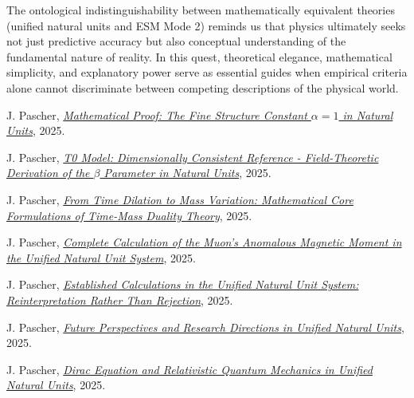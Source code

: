 \documentclass[12pt,a4paper]{article}
\begin{document}
	The ontological indistinguishability between mathematically equivalent theories (unified natural units and ESM Mode 2) reminds us that physics ultimately seeks not just predictive accuracy but also conceptual understanding of the fundamental nature of reality. In this quest, theoretical elegance, mathematical simplicity, and explanatory power serve as essential guides when empirical criteria alone cannot discriminate between competing descriptions of the physical world.
	
	\begin{thebibliography}{99}
		J. Pascher, \href{https://github.com/jpascher/T0-Time-Mass-Duality/blob/main/2/pdf/ResolvingTheConstantsAlfaEn.pdf}{\textit{Mathematical Proof: The Fine Structure Constant $\alpha = 1$ in Natural Units}}, 2025.
		
		J. Pascher, \href{https://github.com/jpascher/T0-Time-Mass-Duality/blob/main/2/pdf/DerivationVonBetaEn.pdf}{\textit{T0 Model: Dimensionally Consistent Reference - Field-Theoretic Derivation of the $\beta$ Parameter in Natural Units}}, 2025.
		
		J. Pascher, \href{https://github.com/jpascher/T0-Time-Mass-Duality/blob/main/2/pdf/MathZeitMasseLagrangeEn.pdf}{\textit{From Time Dilation to Mass Variation: Mathematical Core Formulations of Time-Mass Duality Theory}}, 2025.
		
		J. Pascher, \href{https://github.com/jpascher/T0-Time-Mass-Duality/blob/main/2/pdf/CompleteMuon_g-2_AnalysisEn.pdf}{\textit{Complete Calculation of the Muon's Anomalous Magnetic Moment in the Unified Natural Unit System}}, 2025.
		
		J. Pascher, \href{https://github.com/jpascher/T0-Time-Mass-Duality/blob/main/2/pdf/PragmaticApproachT0-ModelEn.pdf}{\textit{Established Calculations in the Unified Natural Unit System: Reinterpretation Rather Than Rejection}}, 2025.
		
		J. Pascher, \href{https://github.com/jpascher/T0-Time-Mass-Duality/blob/main/2/pdf/ausblicke_En.pdf}{\textit{Future Perspectives and Research Directions in Unified Natural Units}}, 2025.
		
		J. Pascher, \href{https://github.com/jpascher/T0-Time-Mass-Duality/blob/main/2/pdf/diracEn.pdf}{\textit{Dirac Equation and Relativistic Quantum Mechanics in Unified Natural Units}}, 2025.
		

\end{thebibliography}
\end{document}
